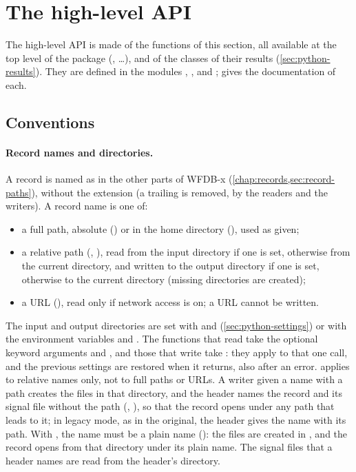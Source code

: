\section{The high-level API}
\label{sec:python-api}

The high-level API is made of the functions of this section, all available at the top
level of the package (, \ldots), and of the classes of their
results (\cref{sec:python-results}). They are defined in the modules
, ,  and
;  gives the documentation of each.

\subsection{Conventions}
\label{sec:python-conventions}

\paragraph{Record names and directories.} A record is named as in the other parts of
WFDB-x (\cref{chap:records,sec:record-paths}), without the  extension (a
trailing  is removed, by the readers and the writers). A record name is one
of:
\begin{itemize}
\item a full path, absolute () or in the home directory
  (), used as given;
\item a relative path (, ), read from the input directory
  if one is set, otherwise from the current directory, and written to the output
  directory if one is set, otherwise to the current directory (missing directories are
  created);
\item a URL (), read only if network
  access is on; a URL cannot be written.
\end{itemize}
The input and output directories are set with  and
 (\cref{sec:python-settings}) or with the environment
variables  and . The functions that read
take the optional keyword arguments  and , and those that
write take : they apply to that one call, and the previous settings are
restored when it returns, also after an error.  applies to relative
names only, not to full paths or URLs. A writer given a name with a path creates the
files in that directory, and the header names the record and its signal file without the
path (, ), so that the record opens under any path that leads to
it; in legacy mode, as in the original, the header gives the name with its path. With
, the name must be a plain name (): the files are created in
, and the record opens from that directory under its plain name. The signal
files that a header names are read from the header's directory.

